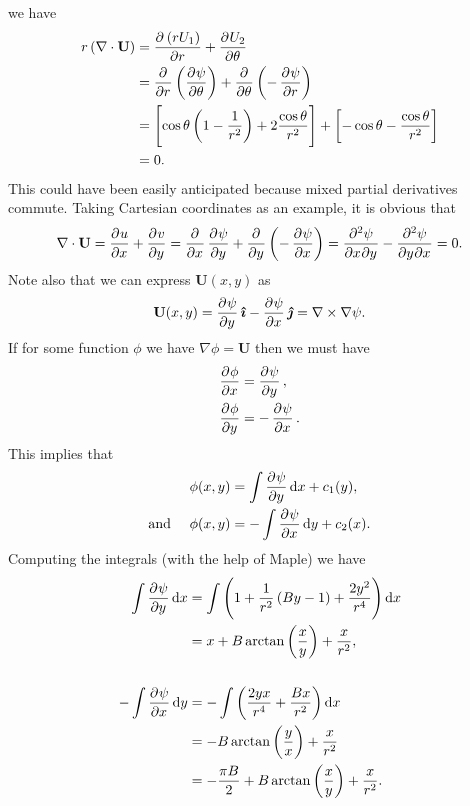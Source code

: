 \documentclass{article}
\def\*#1{\mathbf{#1}}
\newcommand{\ihat}{\boldsymbol{\hat{\imath}}}
\newcommand{\jhat}{\boldsymbol{\hat{\jmath}}}
\begin{document}
%
we have
%
\begin{align*}
    r \del{\nabla \cdot \*U}
        &= \dpd{\del{r U_1}}{r} + \dpd{U_2}{\theta} \\
        &= \dpd{}{r} \del{\dpd{\psi}{\theta}} +  \dpd{}{\theta} \del{- \dpd{\psi}{r}} \\
        &= \sbr{\cos \theta \del{1 - \frac{1}{r^2}} + 2 \frac{\cos \theta}{r^2}}
           + \sbr{-\cos \theta - \frac{\cos \theta}{r^2}} \\
        &= 0
        .
\end{align*}
%
This could have been easily anticipated because mixed partial
derivatives commute. Taking Cartesian coordinates as an example, it is
obvious that
%
\begin{equation*}
    \nabla \cdot \*U = \dpd{u}{x} + \dpd{v}{y}
                     = \dpd{}{x} \dpd{\psi}{y} + \dpd{}{y} \del{- \dpd{\psi}{x}}
                     = \dmd{\psi}{2}{x}{}{y}{} - \dmd{\psi}{2}{y}{}{x}{}
                     = 0
    .
\end{equation*}
%
Note also that we can express $\*U(x, y)$ as
%
\begin{equation*}
    \*U(x, y) = \dpd{\psi}{y} \ihat - \dpd{\psi}{x} \jhat = \nabla \times \nabla \psi
    .
\end{equation*}
%
If for some function $\phi$ we have $\nabla \phi = \*U$ then we must
have
%
\begin{align*}
    \dpd{\phi}{x} &= \dpd{\psi}{y}, \\
    \dpd{\phi}{y} &= - \dpd{\psi}{x}.
\end{align*}
%
This implies that
%
\begin{align*}
    \phi(x, y) &= \int \dpd{\psi}{y} \dif x + c_1(y), \\
    \text{and } \quad \phi(x, y) &= - \int \dpd{\psi}{x} \dif y + c_2(x).
\end{align*}
%
Computing the integrals (with the help of Maple) we have
%
\begin{align*}
    \int \dpd{\psi}{y} \dif x
        &= \int
            \del{
            1
            + \frac{1}{r^2} \del{B y - 1}
            + \frac{2 y^2}{r^4}
            }
           \dif x \\
        &= x + B \arctan \del{\frac{x}{y}} + \frac{x}{r^2}, \\ \\
    - \int \dpd{\psi}{x} \dif y
        &= - \int
            \del{
            \frac{2 y x}{r^4}
            + \frac{B x}{r^2}
            }
           \dif x \\
        &=  - B \arctan \del{\frac{y}{x}} + \frac{x}{r^2} \\
        &=  - \frac{\pi B}{2} + B \arctan \del{\frac{x}{y}} + \frac{x}{r^2}
        .
\end{align*}
\end{document}
